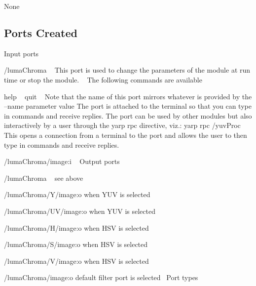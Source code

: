 \begin{DoxyItemize}
\item None
\end{DoxyItemize}\hypertarget{group__blobExtractor_portsc_sec}{}\subsection{Ports Created}\label{group__blobExtractor_portsc_sec}
Input ports


\begin{DoxyItemize}
\item {\ttfamily /luma\+Chroma} ~\newline
 This port is used to change the parameters of the module at run time or stop the module. ~\newline
 The following commands are available

{\ttfamily help} ~\newline
 {\ttfamily quit} ~\newline
 Note that the name of this port mirrors whatever is provided by the {\ttfamily --name} parameter value The port is attached to the terminal so that you can type in commands and receive replies. The port can be used by other modules but also interactively by a user through the yarp rpc directive, viz.\+: {\ttfamily yarp} {\ttfamily rpc} {\ttfamily /yuv\+Proc} This opens a connection from a terminal to the port and allows the user to then type in commands and receive replies.
\item {\ttfamily /luma\+Chroma/image}\+:i ~\newline
 Output ports
\item {\ttfamily /luma\+Chroma} ~\newline
 see above
\item {\ttfamily /luma\+Chroma/\+Y/image}\+:o when Y\+UV is selected~\newline

\item {\ttfamily /luma\+Chroma/\+U\+V/image}\+:o when Y\+UV is selected~\newline

\item {\ttfamily /luma\+Chroma/\+H/image}\+:o when H\+SV is selected~\newline

\item {\ttfamily /luma\+Chroma/\+S/image}\+:o when H\+SV is selected~\newline

\item {\ttfamily /luma\+Chroma/\+V/image}\+:o when H\+SV is selected~\newline

\item {\ttfamily /luma\+Chroma/image}\+:o default filter port is selected~\newline
 Port types
\end{DoxyItemize}

